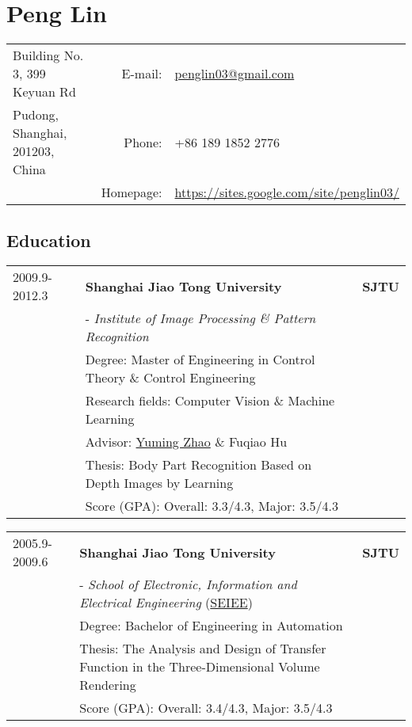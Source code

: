 \documentclass[10pt, a4paper]{article}
\author{Peng Lin}
\date{\today}
\title{}
\begin{document}
\pagestyle{empty}
\setlength{\parindent}{0cm}

\sectionfont{
  \huge\bfseries
}

\subsectionfont{
  \sectionrule{0pt}{0pt}{-5pt}{0.8pt}
}

\section*{Peng Lin}
\label{sec-1}
\begin{center}
\begin{tabularx}{\linewidth}{Xrl}
Building No. 3, 399 Keyuan Rd & E-mail: & \href{mailto:penglin03@gmail.com}{penglin03@gmail.com}\\
Pudong, Shanghai, 201203, China & Phone: & +86 189 1852 2776\\
 & Homepage: & \url{https://sites.google.com/site/penglin03/}\\
\end{tabularx}
\end{center}

\subsection*{Education}
\label{sec-1-1}
\begin{center}
\begin{tabularx}{\linewidth}{lXr}
2009.9-2012.3 & \textbf{Shanghai Jiao Tong University} & \textbf{SJTU}\\
 & - \emph{Institute of Image Processing \& Pattern Recognition} & \\
 & Degree: Master of Engineering in Control Theory \& Control Engineering & \\
 & Research fields: Computer Vision \& Machine Learning & \\
 & Advisor:  {\href{http://automation.sjtu.edu.cn/en/ShowPeople.aspx?info_id=406&info_lb=326&flag=224}{Yuming Zhao}} \& Fuqiao Hu & \\
 & Thesis: Body Part Recognition Based on Depth Images by Learning & \\
 & Score (GPA): Overall: 3.3/4.3, Major: 3.5/4.3 & \\
\end{tabularx}
\end{center}

\begin{center}
\begin{tabularx}{\linewidth}{lXr}
2005.9-2009.6 & \textbf{Shanghai Jiao Tong University} & \textbf{SJTU}\\
 & - \emph{School of Electronic, Information and Electrical Engineering} ({\href{http://english.seiee.sjtu.edu.cn/}{SEIEE}}) & \\
 & Degree: Bachelor of Engineering in Automation & \\
 & Thesis: The Analysis and Design of Transfer Function in the Three-Dimensional Volume Rendering & \\
 & Score (GPA): Overall: 3.4/4.3, Major: 3.5/4.3 & \\
\end{tabularx}
\end{center}
\end{document}
